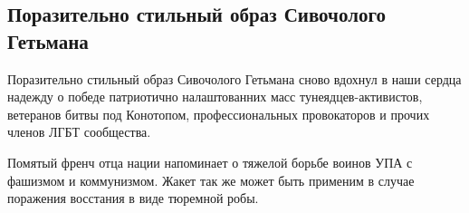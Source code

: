 


 

\subsection{Поразительно стильный образ Сивочолого Гетьмана}
\label{sec:15_10_2020.fb.anton_shevcov.1}


Поразительно стильный образ Сивочолого Гетьмана сново вдохнул в наши сердца
надежду о победе патриотично налаштованних масс тунеядцев-активистов, ветеранов
битвы под Конотопом, профессиональных провокаторов и прочих членов ЛГБТ
сообщества. 

Помятый френч отца нации напоминает о тяжелой борьбе воинов УПА с фашизмом и
коммунизмом.  Жакет так же может быть применим в случае поражения восстания в
виде тюремной робы.

